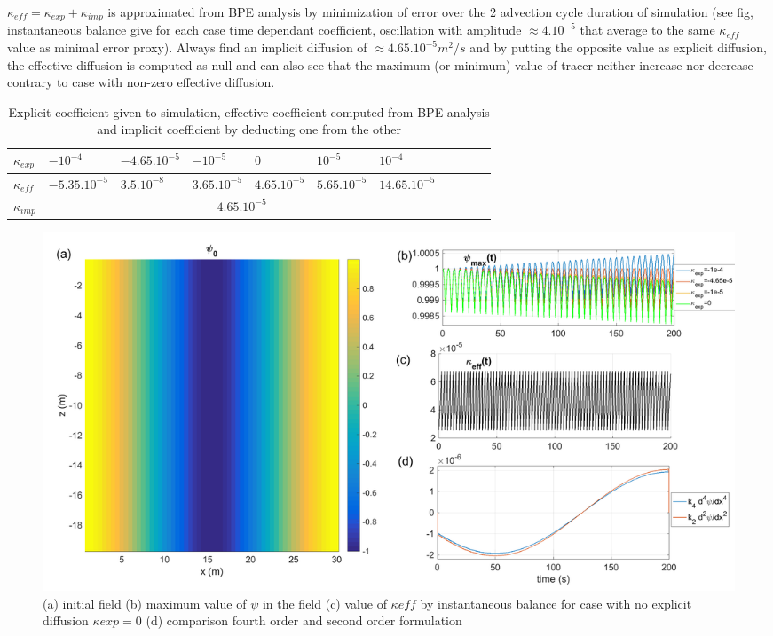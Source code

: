$\kappa_{eff} = \kappa_{exp} + \kappa_{imp}$ is approximated from BPE analysis by minimization of error over the 2 advection cycle duration of simulation (see fig, instantaneous balance give for each case time dependant coefficient, oscillation with amplitude $\approx 4.10^{-5}$ that average to the same $\kappa_{eff}$ value as minimal error proxy). Always find an implicit diffusion of $\approx 4.65.10^{-5} m^2/s$ and by putting the opposite value as explicit diffusion, the effective diffusion is computed as null and can also see that the maximum (or minimum) value of tracer neither increase nor decrease contrary to case with non-zero effective diffusion.


\begin{table}[h!]
\centering
\begin{tabular}{|l|l|l|l|l|l|l|l|l|l|l|}
\hline
$\kappa_{exp}$ & $-10^{-4}$ &$-4.65.10^{-5}$ & $-10^{-5}$& $0$& $10^{-5}$& $10^{-4}$\\
\hline
$\kappa_{eff}$ & $-5.35.10^{-5}$ &$3.5.10^{-8}$ & $3.65.10^{-5}$& $4.65.10^{-5}$& $5.65.10^{-5}$& $14.65.10^{-5}$\\
\hline
$\kappa_{imp}$&\multicolumn{6}{c|}{$4.65.10^{-5}$}\\
\hline
\end{tabular}
\caption{Explicit coefficient given to simulation, effective coefficient computed from BPE analysis and implicit coefficient by deducting one from the other}
\end{table}

\begin{figure}[h!]
\centering
\includegraphics[width=1\textwidth]{./CHAP_BPE/AGBPE_numlab5.png}
\caption{(a) initial field  (b) maximum value of $\psi$ in the field  (c) value of $\kappa{eff}$ by instantaneous balance for case with no explicit diffusion $\kappa{exp}=0$ (d) comparison fourth order and second order formulation}
\label{fig5numlab}
\end{figure}

